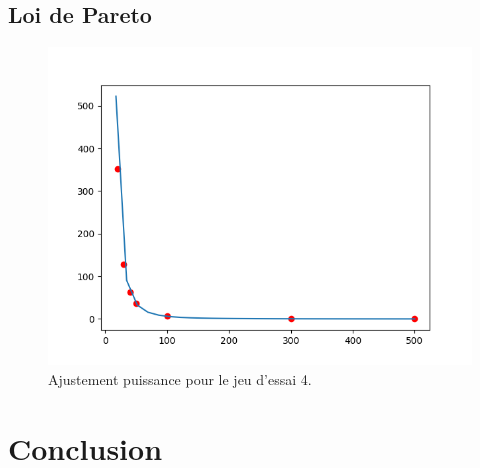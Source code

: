 \documentclass[12pt,french,titlepage]{article}
\begin{document}
	\subsection{Loi de Pareto}
		\begin{figure}[H]
		\includegraphics[width=\textwidth]{"4.png"}
		\caption{Ajustement puissance pour le jeu d'essai 4.}
		\end{figure}
	
	\section{Conclusion}
	
	
	
\end{document}
